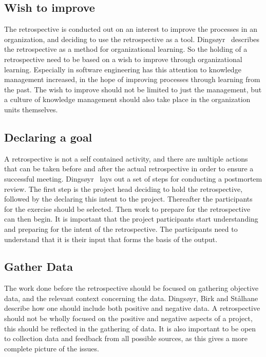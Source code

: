 \documentclass[12pt]{article}
\begin{document}
\subsection{Wish to improve}
The retrospective is conducted out on an interest to improve the processes in an organization, and deciding to use the retrospective as a tool. Dingsøyr~\cite{Dingsoyr2005} describes the retrospective as a method for organizational learning. So the holding of a retrospective need to be based on a wish to improve through organizational learning. Especially in software engineering has this attention to knowledge management increased, in the hope of improving processes through learning from the past. The wish to improve should not be limited to just the management, but a culture of knowledge management should also take place in the organization units themselves.

\subsection{Declaring a goal}
A retrospective is not a self contained activity, and there are multiple actions that can be taken before and after the actual retrospective in order to ensure a successful meeting. Dingsøyr~\cite{Dingsoyr2005} lays out a set of steps for conducting a postmortem review. The first step is the project head deciding to hold the retrospective, followed by the declaring this intent to the project. Thereafter the participants for the exercise should be selected. Then work to prepare for the retrospective can then begin. It is important that the project participants start understanding and preparing for the intent of the retrospective. The participants need to understand that it is their input that forms the basis of the output.

\subsection{Gather Data}
The work done before the retrospective should be focused on gathering objective data, and the relevant context concerning the data. Dingsøyr, Birk and Stålhane~\cite{Moe2001}  describe how one should include both positive and negative data. A retrospective should not be wholly focused on the positive and negative aspects of a project, this should be reflected in the gathering of data. It is also important to be open to collection data and feedback from all possible sources, as this gives a more complete picture of the issues.
\end{document}
